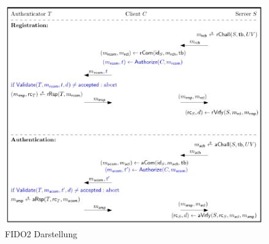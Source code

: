 \begin{figure}[h]
	\centering 
	\includegraphics[width=1\textwidth]{img/abbildungen/Fido2.png}
	\captionsetup{format=hang}
	\caption{FIDO2 Darstellung} \label{fido2-process}
\end{figure}

